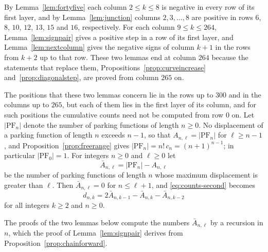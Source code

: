 \documentclass{amsart}
\makeatletter
\theoremstyle{definition}
\theoremstyle{remark}
\numberwithin{equation}{section}
\def\subsection{\@startsection{subsection}{2}\z@{.5\linespacing\@plus.7\linespacing}{-.5em}{\normalfont\bfseries\boldmath}}
\makeatother
\begin{document}
\subsection{Columns 9 to 264}\label{subsec:tables-large}

By Lemma~\ref{lem:fortyfive} each column $2\le k\le8$ is negative in every
row of its first layer, and by Lemma~\ref{lem:junction} columns
$2,3,\dots,8$ are positive in rows $6$, $8$, $10$, $12$, $13$, $15$ and
$16$, respectively. For each column $9\le k\le264$,
Lemma~\ref{lem:signpair} gives a positive step in a row of its first layer,
and Lemma~\ref{lem:nextcolumn} gives the negative signs of column $k+1$ in
the rows from $k+2$ up to that row. These two lemmas end
at column $264$ because the statements that replace them,
Propositions~\ref{prop:curveincrease} and~\ref{prop:diagonalstep}, are
proved from column $265$ on.

The positions that these two lemmas concern lie in the rows up to $300$ and
in the columns up to $265$, but each of them lies in the first layer of its
column, and for such positions the cumulative counts need not be computed
from row $0$ on. Let $\lvert\mathrm{PF}_n\rvert$ denote the number of parking
functions of length $n\ge0$. No displacement of a parking function of length
$n$ exceeds $n-1$, so that $A_{n,\ell}=\lvert\mathrm{PF}_n\rvert$ for
$\ell\ge n-1$, and Proposition~\ref{prop:freerange} gives
$\lvert\mathrm{PF}_n\rvert=n!\,c_n=(n+1)^{n-1}$; in particular
$\lvert\mathrm{PF}_0\rvert=1$. For integers $n\ge0$ and $\ell\ge0$ let
\[
\bar A_{n,\ell}=\lvert\mathrm{PF}_n\rvert-A_{n,\ell}
\]
be the number of parking functions of length $n$ whose maximum displacement
is greater than $\ell$. Then $\bar A_{n,\ell}=0$ for $n\le\ell+1$, and
\eqref{eq:counts-second} becomes
\begin{equation}\label{eq:tables-complement}
d_{n,k}=2\bar A_{n,k-1}-\bar A_{n,k}-\bar A_{n,k-2}
\end{equation}
for all integers $k\ge2$ and $n\ge0$.

The proofs of the two lemmas below compute the numbers $\bar A_{n,\ell}$ by
a recursion in $n$, which the proof of Lemma~\ref{lem:signpair} derives
from Proposition~\ref{prop:chainforward}.
\end{document}

